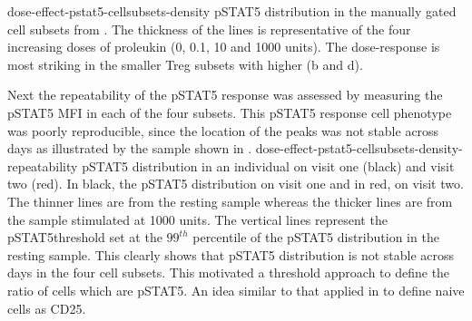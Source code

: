 {dose-effect-pstat5-cellsubsets-density}
{ pSTAT5 distribution in the manually gated cell subsets from . }
{
The thickness of the lines is representative of the four increasing doses of proleukin (0, 0.1, 10 and 1000 units).
The dose-response is most striking in the smaller Treg subsets with higher  (b and d).
}

Next the repeatability of the pSTAT5 response was assessed by measuring the pSTAT5 \gls{MFI} in each of the four subsets.
This pSTAT5 response cell phenotype was poorly reproducible, since the location of the peaks was not stable across days as illustrated by the sample shown in .
{dose-effect-pstat5-cellsubsets-density-repeatability}
{ pSTAT5 distribution in an individual on visit one (black) and visit two (red).
}
{
In black, the pSTAT5 distribution on visit one and in red, on visit two.
The thinner lines are from the resting sample whereas the thicker lines are from the sample stimulated at 1000 units.
The vertical lines represent the pSTAT5\positive threshold set at the $99^{th}$ percentile of the pSTAT5 distribution in the resting sample.
This clearly shows that pSTAT5 distribution is not stable across days in the four cell subsets.
}
This motivated a threshold approach to define the ratio of cells which are pSTAT5\positive.
An idea similar to that applied in  to define naive cells as CD25\positive.
